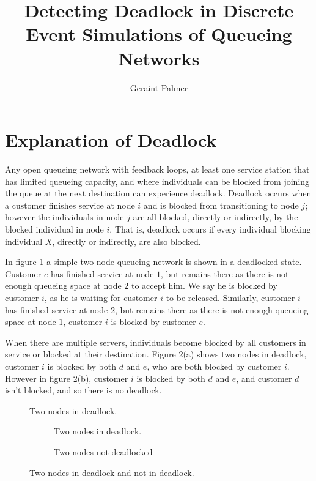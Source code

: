 \documentclass{article}
\title{Detecting Deadlock in Discrete Event Simulations of Queueing Networks}
\author{Geraint Palmer}
\date{}
\begin{document}
\onehalfspacing

\maketitle

\section{Explanation of Deadlock}

Any open queueing network with feedback loops, at least one service station that has limited queueing capacity, and where individuals can be blocked from joining the queue at the next destination can experience deadlock.
Deadlock occurs when a customer finishes service at node $i$ and is blocked from transitioning to node $j$; however the individuals in node $j$ are all blocked, directly or indirectly, by the blocked individual in node $i$.
That is, deadlock occurs if every individual blocking individual $X$, directly or indirectly, are also blocked.\newline

In figure 1 a simple two node queueing network is shown in a deadlocked state.
Customer $e$ has finished service at node $1$, but remains there as there is not enough queueing space at node $2$ to accept him.
We say he is blocked by customer $i$, as he is waiting for customer $i$ to be released.
Similarly, customer $i$ has finished service at node $2$, but remains there as there is not enough queueing space at node $1$, customer $i$ is blocked by customer $e$.\newline

When there are multiple servers, individuals become blocked by all customers in service or blocked at their destination.
Figure 2(a) shows two nodes in deadlock, customer $i$ is blocked by both $d$ and $e$, who are both blocked by customer $i$.
However in figure 2(b), customer $i$ is blocked by both $d$ and $e$, and customer $d$ isn't blocked, and so there is no deadlock.\newline

\begin{figure}[H]
  
  \caption{Two nodes in deadlock.}
\end{figure}

\begin{figure}[H]
\begin{subfigure}[b]{\textwidth}
  
  \caption{Two nodes in deadlock.}
\end{subfigure}
\begin{subfigure}[b]{\textwidth}
  
  \caption{Two nodes not deadlocked}
\end{subfigure}
\caption{Two nodes in deadlock and not in deadlock.}
\end{figure}
\end{document}
